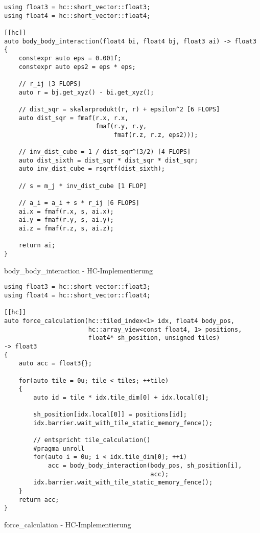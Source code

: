 \begin{code}
    \begin{verbatim}
using float3 = hc::short_vector::float3;
using float4 = hc::short_vector::float4;

[[hc]]
auto body_body_interaction(float4 bi, float4 bj, float3 ai) -> float3
{
    constexpr auto eps = 0.001f;
    constexpr auto eps2 = eps * eps;

    // r_ij [3 FLOPS]
    auto r = bj.get_xyz() - bi.get_xyz();

    // dist_sqr = skalarprodukt(r, r) + epsilon^2 [6 FLOPS]
    auto dist_sqr = fmaf(r.x, r.x,
                         fmaf(r.y, r.y,
                              fmaf(r.z, r.z, eps2)));

    // inv_dist_cube = 1 / dist_sqr^(3/2) [4 FLOPS]
    auto dist_sixth = dist_sqr * dist_sqr * dist_sqr;
    auto inv_dist_cube = rsqrtf(dist_sixth);

    // s = m_j * inv_dist_cube [1 FLOP]

    // a_i = a_i + s * r_ij [6 FLOPS]
    ai.x = fmaf(r.x, s, ai.x);
    ai.y = fmaf(r.y, s, ai.y);
    ai.z = fmaf(r.z, s, ai.z);

    return ai;
}
    \end{verbatim}
    \caption{body\_body\_interaction - HC-Implementierung}
    \label{anhang:hc:bodybodyinteraction}
\end{code}

\begin{code}
    \begin{verbatim}
using float3 = hc::short_vector::float3;
using float4 = hc::short_vector::float4;

[[hc]]
auto force_calculation(hc::tiled_index<1> idx, float4 body_pos,
                       hc::array_view<const float4, 1> positions,
                       float4* sh_position, unsigned tiles)
-> float3
{
    auto acc = float3{};

    for(auto tile = 0u; tile < tiles; ++tile)
    {
        auto id = tile * idx.tile_dim[0] + idx.local[0];

        sh_position[idx.local[0]] = positions[id];
        idx.barrier.wait_with_tile_static_memory_fence();

        // entspricht tile_calculation()
        #pragma unroll
        for(auto i = 0u; i < idx.tile_dim[0]; ++i)
            acc = body_body_interaction(body_pos, sh_position[i],
                                        acc);
        idx.barrier.wait_with_tile_static_memory_fence();
    }
    return acc;
}
    \end{verbatim}
    \caption{force\_calculation - HC-Implementierung}
    \label{anhang:hc:forcecalculation}
\end{code}

